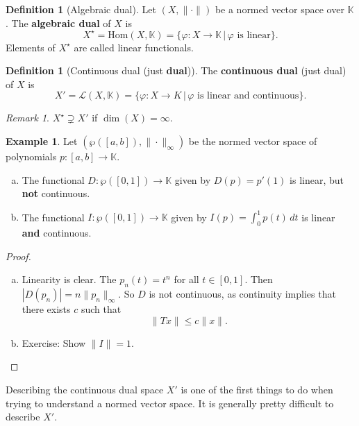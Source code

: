 \documentclass[10pt, oneside, reqno]{amsbook}
\theoremstyle{plain}%
\theoremstyle{definition}
\newtheorem{defn}[thm]{Definition}
\newtheorem{exmp}[thm]{Example}
\theoremstyle{remark}
\newtheorem*{rem}{Remark}
\newcommand{\K}{\mathbb{K}}
\renewcommand{\phi}{\varphi}
\begin{document}
\begin{defn}[Algebraic dual]
    Let $(X, \| \cdot \|)$ be a normed vector space over $\K$.  The \textbf{algebraic dual} of $X$ is \[
        X^\star = \text{Hom}(X, \K) = \{ \phi: X \rightarrow \K \, | \, \text{$\phi$ is linear} \}.
    \]  Elements of $X^\star$ are called linear functionals.
\end{defn}

\begin{defn}[Continuous dual (just \textbf{dual})]
    The \textbf{continuous dual} (just dual) of $X$ is \[
        X' = \mathcal{L}(X, \K) = \{ \phi : X \rightarrow K \, | \, \text{$\phi$ is linear and continuous} \}.
    \]
\end{defn}

\begin{rem}
    $X^\star \supsetneq X'$ if $\dim(X) = \infty$.
\end{rem}

\begin{exmp}
    Let $(\wp([a,b]), \| \cdot \|_\infty)$ be the normed vector space of polynomials $p: [a,b] \rightarrow \K$.                 
    \begin{enumerate}[(a)]
        \item The functional $D : \wp([0,1]) \rightarrow \K$ given by $D(p) = p'(1)$ is linear, but \textbf{not} continuous.
        \item The functional $I: \wp([0,1]) \rightarrow \K$ given by $I(p) = \int_0^1 p(t) \, dt$ is linear \textbf{and} continuous.
    \end{enumerate}
\end{exmp}

\begin{proof}
\begin{enumerate}[(a)]
        \item Linearity is clear.  The $p_n(t) = t^n$ for all $t \in [0,1]$.  Then $|D(p_n)| =   n \| p_n \|_\infty$.  So $D$ is not continuous, as continuity implies that there exists $c$ such that \[
            \| Tx \| \leq c \| x \|.
        \]
        \item Exercise: Show $\| I \| = 1$.
\end{enumerate}
\end{proof}

Describing the continuous dual space $X'$ is one of the first things to do when trying to understand a normed vector space.  It is generally pretty difficult to describe $X'$.
\end{document}
